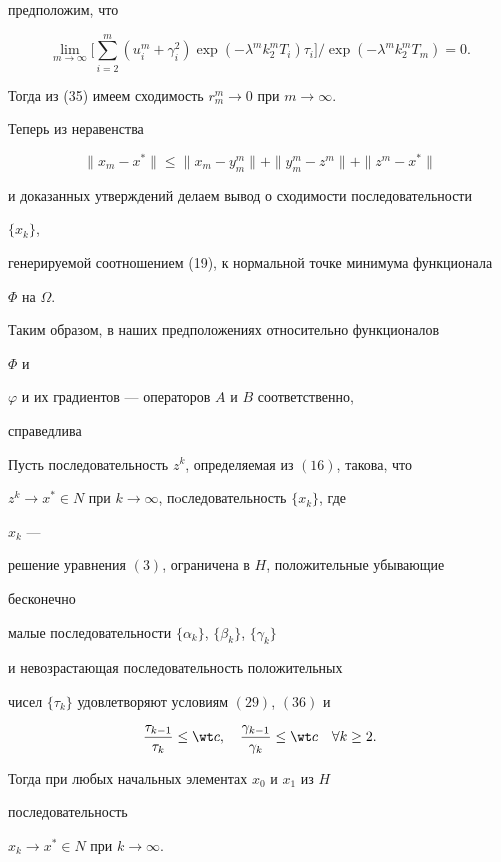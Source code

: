 предположим, что


\begin{equation}\label {36}


\lim_{m\rightarrow \infty }\bigg[\sum_{i=2}^m(u_i^m+\gamma_i^2)


\exp(-\lambda^m


k_2^mT_i)\tau_i\bigg]/\exp(-\lambda^mk_2^mT_m)=0.


\end{equation}


Тогда из (35) имеем сходимость $r_m^m \rightarrow 0$ при $m\rightarrow


\infty$.


Теперь из неравенства


$$


\|x_m-x^*\|\leq \|x_m-y_m^m\|+\|y_m^m-z^m\|+\|z^m-x^*\|


$$


и доказанных утверждений делаем вывод о сходимости последовательности


$\{x_k\}$,


генерируемой соотношением (19), к нормальной точке минимума функционала


$\Phi$ на $\Omega$.





Таким образом, в наших предположениях относительно функционалов


$\Phi$ и


$\varphi$ и их градиентов --- операторов $A$ и $B$ соответственно,


справедлива





\begin{thmnonum}


Пусть последовательность $z^k$, определяемая из $(16)$, такова, что


$z^k\rightarrow x^*


\in N$ при $k\rightarrow \infty $, пoследовательность $\{x_k\}$, где


$x_k$ ---


решение уравнения $(3)$, ограничена в $H$, положительные убывающие


бесконечно


малые последовательности $\{\alpha_k \}$, $\{\beta_k\}$, $\{\gamma_k\}$


и невозрастающая последовательность положительных


чисел $\{\tau_k\}$ удовлетворяют условиям $(29)$, $(36)$ и


$$


\frac{\tau_{k-1}}{\tau_k}\leq \wt c,\quad \frac{\gamma_{k-1}}


{\gamma_k}\leq \wt c \quad\forall k\geq 2.


$$


Тогда при любых начальных элементах $x_0$ и $x_1$ из $H$


последовательность


$x_k \rightarrow x^*\in N$ при $k\rightarrow \infty$.


\end{thmnonum}





